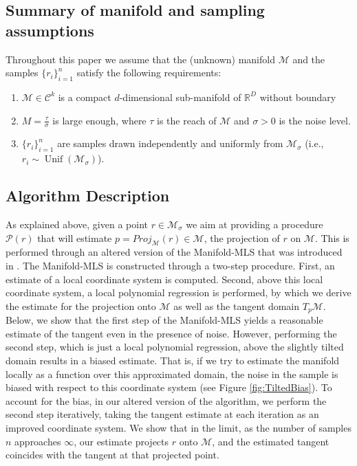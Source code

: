 \documentclass[12pt]{article}
\theoremstyle{remark}
\newcommand{\RR}{\mathbb{R}}
\newcommand{\MM}{\mathcal{M}}
\newcommand{\C}{\mathcal{C}}
\newcommand{\PP}{\mathcal{P}}
\begin{document}
\subsection{Summary of manifold and sampling assumptions}\label{sec:SamplingAssumptions}
Throughout this paper we assume that the (unknown) manifold $\MM$ and the samples $\{r_i\}_{i=1}^n$ satisfy the following requirements: 
\begin{enumerate}
	\item $\MM\in\C^k$ is a compact $d$-dimensional sub-manifold of $\RR^D$ without boundary
	\item $M = \frac{\tau}{\sigma}$ is large enough, where $\tau$ is the reach of $\MM$ and $\sigma>0$ is the noise level. 
	\label{assume:noise}
	\item $\{r_i\}_{i=1}^n$ are samples drawn independently and uniformly from $\MM_\sigma$ (i.e., $r_i\sim \operatorname{Unif}(\MM_\sigma)$).\label{assume:sampling}
\end{enumerate}


\subsection{Algorithm Description}\label{sec:Algorithm}
As explained above, given a point $r\in\MM_\sigma$ we aim at providing a procedure $\PP(r)$ that will estimate $ p = Proj_\MM(r) \in \MM$, the projection of $r$ on $\MM$. 
This is performed through an altered version of the Manifold-MLS that was introduced in \cite{sober2016MMLS}. 
The Manifold-MLS is constructed through a two-step procedure. 
First, an estimate of a local coordinate system is computed.
Second, above this local coordinate system, a local polynomial regression is performed, by which we derive the estimate for the projection onto $\MM$ as well as the tangent domain $T_p\MM$.
Below, we show that the first step of the Manifold-MLS yields a reasonable estimate of the tangent even in the presence of noise.
However, performing the second step, which is just a local polynomial regression, above the slightly tilted domain results in a biased estimate.
That is, if we try to estimate the manifold locally as a function over this approximated domain, the noise in the sample is biased with respect to this coordinate system (see Figure \ref{fig:TiltedBias}).
To account for the bias, in our altered version of the algorithm, we perform the second step iteratively, taking the tangent estimate at each iteration as an improved coordinate system.
We show that in the limit, as the number of samples $n$ approaches $\infty$, our estimate projects $r$ onto $\MM$, and the estimated tangent coincides with the tangent at that projected point.
\end{document}
